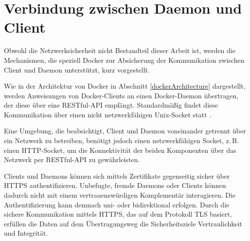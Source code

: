 \documentclass[../main.tex]{subfiles}
\begin{document}


  \section{Verbindung zwischen Daemon und Client}
  \label{conClientServer}
    Obwohl die Netzwerksicherheit nicht Bestandteil dieser Arbeit ist, werden die Mechanismen, die speziell Docker zur Absicherung der Kommunikation zwischen Client und Daemon unterstützt, kurz vorgestellt.

    Wie in der Architektur von Docker in Abschnitt \ref{dockerArchitecture} dargestellt, werden Anweisungen von Docker-Clients an einen Docker-Daemon übertragen, der diese über eine \acrshort{REST}ful-\acrshort{API} empfängt. Standardmäßig findet diese Kommunikation über einen nicht netzwerkfähigen Unix-Socket statt \cite{dockerSecurity}.

    Eine Umgebung, die beabsichtigt, Client und Daemon voneinander getrennt über ein Netzwerk zu betreiben, benötigt jedoch einen netzwerkfähigen Socket, z.\,B. einen \acrshort{HTTP}-Socket, um die Konnektivität der beiden Komponenten über das Netzwerk per RESTful-API zu gewährleisten.

    Clients und Daemons können sich mittels Zertifikate gegenseitig sicher über HTTPS authentifizieren. Unbefugte, fremde Daemons oder Clients können dadurch nicht mit einem vertrauenswürdigen Komplementär interagieren. Die Authentifizierung kann demnach uni- oder bidirektional erfolgen. Durch die sichere Kommunikation mittels HTTPS, das auf dem Protokoll \acrshort{TLS} basiert, erfüllen die Daten auf dem Übertragungsweg die Sicherheitsziele Vertraulichkeit und Integrität.
\end{document}
